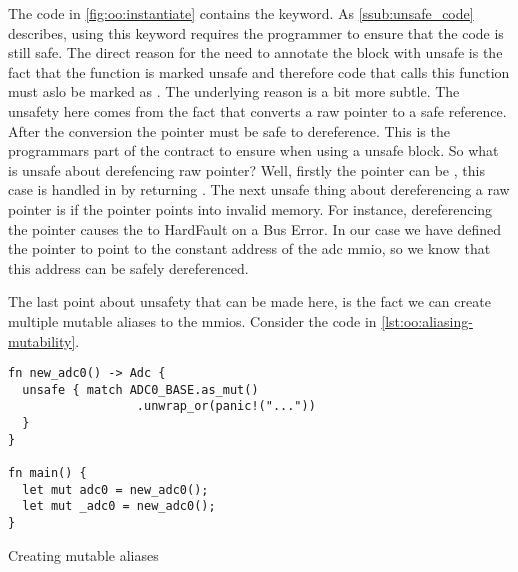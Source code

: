 The {\rust} code in \autoref{fig:oo:instantiate} contains the {\unsafe} keyword.
As \autoref{ssub:unsafe_code} describes, using this keyword requires the programmer to ensure that the code is still safe.
The direct reason for the need to annotate the block with unsafe is the fact that the function  is marked unsafe and therefore code that calls this function must aslo be marked as .
The underlying reason is a bit more subtle.
The unsafety here comes from the fact that  converts a raw pointer to a safe reference.
After the conversion the pointer must be safe to dereference.
This is the programmars part of the contract to ensure when using a unsafe block.
So what is unsafe about derefencing raw pointer?
Well, firstly the pointer can be , this case is handled in  by returning .
The next unsafe thing about dereferencing a raw pointer is if the pointer points into invalid memory.
For instance, dereferencing the pointer   causes the {\gecko} to HardFault on a Bus Error.
In our case we have defined the pointer to point to the constant address of the \gls{adc} \gls{mmio}, so we know that this address can be safely dereferenced.

The last point about unsafety that can be made here, is the fact we can create multiple mutable aliases to the \glspl{mmio}.
Consider the code in \autoref{lst:oo:aliasing-mutability}.

\begin{listing}[H]
  \begin{verbatim}
fn new_adc0() -> Adc {
  unsafe { match ADC0_BASE.as_mut()
                  .unwrap_or(panic!("..."))
  }
}

fn main() {
  let mut adc0 = new_adc0();
  let mut _adc0 = new_adc0();
}
  \end{verbatim}
  \caption{Creating mutable aliases}
  \label{lst:oo:aliasing-mutability}
\end{listing}
